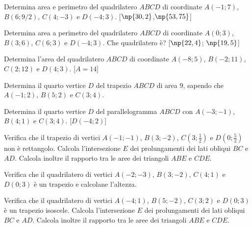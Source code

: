 \begin{multicols}{2}
\begin{esercizio}
\label{ese:7.91}
Determina area e perimetro del quadrilatero \(ABCD\) di coordinate 
\(A(-1;7)\), \(B(6;9/2)\), \(C(4;-3)\) e \(D(-4;3)\).
\hfill[\(\np{30,2}\),\quad \(\np{53,75}\)]
\end{esercizio}

\begin{esercizio}
\label{ese:7.92}
Determina area a perimetro del quadrilatero \(ABCD\) di coordinate 
\(A(0;3)\), \(B(3;6)\), \(C(6;3)\) e \(D(-4;3)\). Che quadrilatero è?
\hfill[\(\np{22,4}\); \(\np{19,5}\)]
\end{esercizio}

\begin{esercizio}
\label{ese:7.93}
Determina l'area del quadrilatero \(ABCD\) di coordinate \(A(-8;5)\), 
\(B(-2;11)\), \(C(2;12)\) e \(D(4;3)\).
\hfill[\(A=14\)]
\end{esercizio}

\begin{esercizio}
\label{ese:7.94}
Determina il quarto vertice \(D\) del trapezio \(ABCD\) di area \(9\), 
sapendo che \(A(-1;2)\), \(B(5;2)\) e \(C(3;4)\).
\end{esercizio}

\begin{esercizio}
\label{ese:7.95}
Determina il quarto vertice \(D\) del parallelogramma \(ABCD\) con 
\(A(-3;-1)\), \(B(4;1)\) e \(C(3;4)\).
\hfill[\(D(-4;2)\)]
\end{esercizio}

\begin{esercizio}
\label{ese:7.96}
Verifica che il trapezio di vertici \(A(-1;-1)\), \(B(3;-2)\), 
\(C\left(3;\frac{1}{2}\right)\) e \(D\left(0;\frac{5}{2}\right)\) non è 
rettangolo. Calcola l'intersezione \(E\) dei prolungamenti dei lati 
obliqui \(BC\) e \(AD\). Calcola inoltre il rapporto tra le aree dei 
triangoli \(ABE\) e \(CDE\).
\end{esercizio}

\begin{esercizio}
\label{ese:7.97}
Verifica che il quadrilatero di vertici \(A(-2;-3)\), \(B(3;-2)\), 
\(C(4;1)\) e \(D(0;3)\) è un trapezio e calcolane l'altezza.
\end{esercizio}

\begin{esercizio}
\label{ese:7.98}
Verifica che il quadrilatero di vertici \(A(-4;1)\), \(B(5;-2)\), 
\(C(3;2)\) e \(D(0;3)\) è un trapezio isoscele. Calcola l'intersezione \(E\) 
dei prolungamenti dei lati obliqui \(BC\) e \(AD\). Calcola inoltre il 
rapporto tra le aree dei triangoli \(ABE\) e \(CDE\).
\end{esercizio}


\end{multicols}
